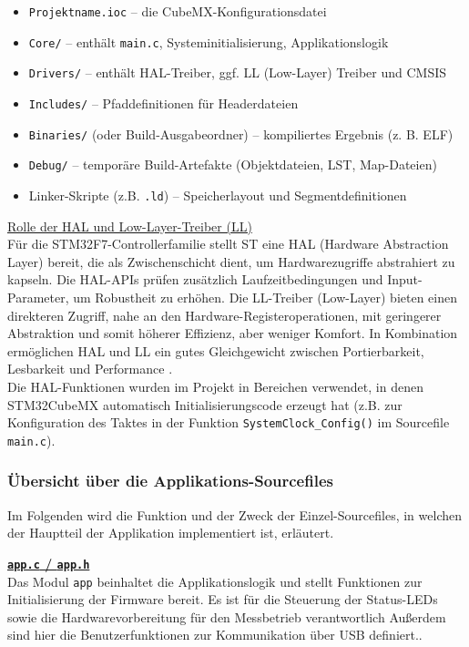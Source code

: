 \documentclass[a4paper, portrait, 12pt]{scrartcl} %
\begin{document}
\begin{itemize}
	\item \texttt{Projektname.ioc} – die CubeMX-Konfigurationsdatei
	\item \texttt{Core/} – enthält \texttt{main.c}, Systeminitialisierung, Applikationslogik
	\item \texttt{Drivers/} – enthält HAL-Treiber, ggf. LL (Low-Layer) Treiber und CMSIS
	\item \texttt{Includes/} – Pfaddefinitionen für Headerdateien
	\item \texttt{Binaries/} (oder Build-Ausgabeordner) – kompiliertes Ergebnis (z. B. ELF)
	\item \texttt{Debug/} – temporäre Build-Artefakte (Objektdateien, LST, Map-Dateien)
	\item Linker-Skripte (z.B. \texttt{.ld}) – Speicherlayout und Segmentdefinitionen
\end{itemize}

\underline{Rolle der HAL und Low-Layer-Treiber (LL)}\\
Für die STM32F7-Controllerfamilie stellt ST eine HAL (Hardware Abstraction Layer) bereit, die als Zwischenschicht dient, um Hardwarezugriffe abstrahiert zu kapseln. Die HAL-APIs prüfen zusätzlich Laufzeitbedingungen und Input-Parameter, um Robustheit zu erhöhen. Die LL-Treiber (Low-Layer) bieten einen direkteren Zugriff, nahe an den Hardware-Registeroperationen, mit geringerer Abstraktion und somit höherer Effizienz, aber weniger Komfort.
In Kombination ermöglichen HAL und LL ein gutes Gleichgewicht zwischen Portierbarkeit, Lesbarkeit und Performance \cite{STmicroelectronics2023}.\\

Die HAL-Funktionen wurden im Projekt in Bereichen verwendet, in denen STM32CubeMX automatisch Initialisierungscode erzeugt hat (z.B. zur Konfiguration des Taktes in der Funktion \texttt{SystemClock\_Config()} im Sourcefile \texttt{main.c}).\\

\subsubsection{Übersicht über die Applikations-Sourcefiles}
Im Folgenden wird die Funktion und der Zweck der Einzel-Sourcefiles, in welchen der Hauptteil der Applikation implementiert ist, erläutert.\\
\footnotesize

\underline{\textbf{\texttt{app.c} / \texttt{app.h}}}\\
Das Modul \texttt{app} beinhaltet die Applikationslogik und stellt Funktionen zur Initialisierung der Firmware bereit.
Es ist für die Steuerung der Status-LEDs sowie die Hardwarevorbereitung für den Messbetrieb verantwortlich Außerdem sind hier die Benutzerfunktionen zur Kommunikation über USB definiert..
\end{document}
